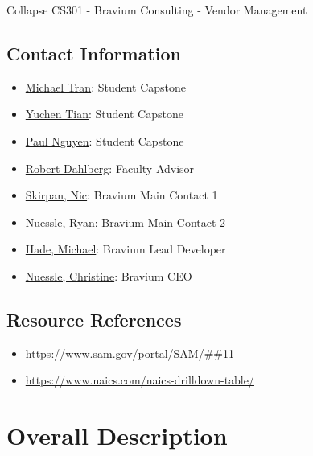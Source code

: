 \documentclass[10pt]{article}
\begin{document}
Collapse CS301 - Bravium Consulting - Vendor Management

\subsection{Contact Information}

\begin{itemize}
	\item\href{tranml3@mymail.vcu.edu}{Michael Tran}: Student Capstone 
	\item\href{tiany4@mymail.vcu.edu}{Yuchen Tian}: Student Capstone 
	\item\href{nguyenp22@mymail.vcu.edu}{Paul Nguyen}: Student Capstone 
	\item\href{dahlbergra@mymail.vcu.edu}{Robert Dahlberg}: Faculty Advisor
	\item\href{nskirpan@braviumconsulting.com}{Skirpan, Nic}: Bravium Main Contact 1
	\item\href{rnuessle@braviumconsulting.com}{Nuessle, Ryan}: Bravium Main Contact 2
	\item\href{mhade@braviumconsulting.com}{Hade, Michael}: Bravium Lead Developer
	\item\href{cnuessle@braviumconsulting.com}{Nuessle, Christine}: Bravium CEO

\end{itemize}

\subsection{Resource References}

\begin{itemize}
	\item \url{https://www.sam.gov/portal/SAM/##11}
	\item \url{https://www.naics.com/naics-drilldown-table/}
\end{itemize}








\section{Overall Description}
\end{document}

